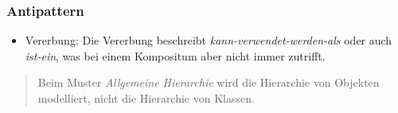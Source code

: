 \subsubsection*{Antipattern}
\begin{itemize}
    \item Vererbung: Die Vererbung beschreibt \textit{kann-verwendet-werden-als} oder auch \textit{ist-ein}, was bei einem Kompositum aber nicht immer zutrifft.
\end{itemize}


\begin{tcolorbox}
    \blockquote[{\cite[28, Hervorhebung eigene]{Wed09b}}]{
        Beim Muster \textit{Allgemeine Hierarchie} wird die Hierarchie von Objekten modelliert, nicht die Hierarchie von Klassen.
    }
\end{tcolorbox}


